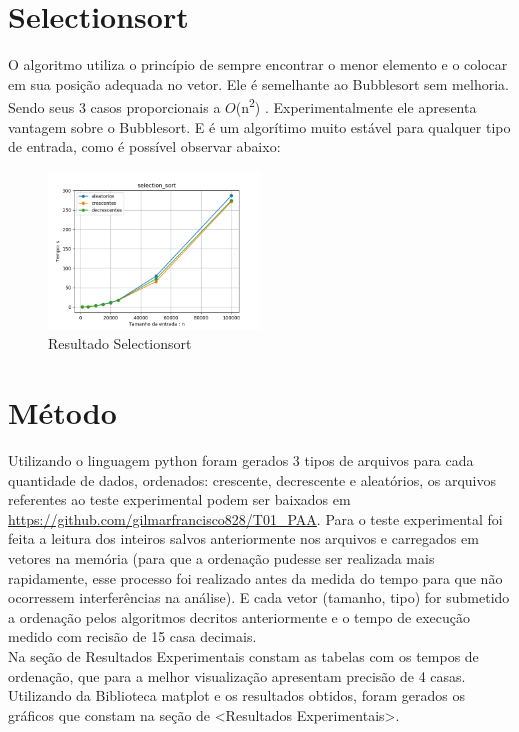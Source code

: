 \documentclass[10pt,a4paper]{article}
\begin{document}
\section{Selectionsort}
    \indent O algoritmo utiliza o princípio de sempre encontrar o menor elemento e o colocar em sua posição adequada no vetor. Ele é semelhante ao Bubblesort sem melhoria. Sendo seus 3 casos proporcionais a $O$(n\textsuperscript{2}) \cite{sunita}. Experimentalmente ele apresenta vantagem sobre o Bubblesort. E é um algorítimo muito estável para qualquer tipo de entrada, como é possível observar abaixo:
    \begin{figure}[H]
    	\centering
    	\includegraphics[width=0.5\textwidth]{Resultados/Graficos/selection_sort.png}
    	\caption{Resultado Selectionsort}
    \end{figure}

\newpage
\section{Método}
    \indent Utilizando o linguagem python foram gerados 3 tipos de arquivos para cada quantidade de dados, ordenados: crescente, decrescente e aleatórios, os arquivos referentes ao teste experimental podem ser baixados em \url{https://github.com/gilmarfrancisco828/T01_PAA}. Para o teste experimental foi feita a leitura dos inteiros salvos anteriormente nos arquivos e carregados em vetores na memória (para que a ordenação pudesse ser realizada mais rapidamente, esse processo foi realizado antes da medida do tempo para que não ocorressem interferências na análise). E cada vetor (tamanho, tipo) for submetido a ordenação pelos algoritmos decritos anteriormente e o tempo de execução medido com recisão de 15 casa decimais.\\
    \indent Na seção de Resultados Experimentais constam as tabelas com os tempos de ordenação, que para a melhor visualização apresentam precisão de 4 casas. Utilizando da Biblioteca matplot e os resultados obtidos, foram gerados os gráficos que constam na seção de <Resultados Experimentais>.
\end{document}
